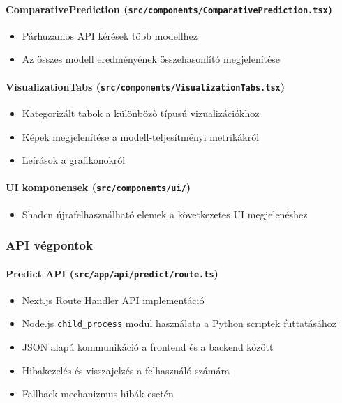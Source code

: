 \paragraph{ComparativePrediction (\texttt{src/components/ComparativePrediction.tsx})}
\begin{itemize}
    \item Párhuzamos API kérések több modellhez
    \item Az összes modell eredményének összehasonlító megjelenítése
\end{itemize}

\paragraph{VisualizationTabs (\texttt{src/components/VisualizationTabs.tsx})}
\begin{itemize}
    \item Kategorizált tabok a különböző típusú vizualizációkhoz
    \item Képek megjelenítése a modell-teljesítményi metrikákról
    \item Leírások a grafikonokról
\end{itemize}

\paragraph{UI komponensek (\texttt{src/components/ui/})}
\begin{itemize}
    \item Shadcn újrafelhasználható elemek a következetes UI megjelenéshez
\end{itemize}

\subsubsection{API végpontok}

\paragraph{Predict API (\texttt{src/app/api/predict/route.ts})}
\begin{itemize}
    \item Next.js Route Handler API implementáció
    \item Node.js \texttt{child\_process} modul használata a Python scriptek futtatásához
    \item JSON alapú kommunikáció a frontend és a backend között
    \item Hibakezelés és visszajelzés a felhasználó számára
    \item Fallback mechanizmus hibák esetén
\end{itemize}

